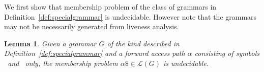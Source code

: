 \documentclass[9pt,preprint,nonatbib]{sigplanconf}
\newtheorem{proposition}[theorem]{Proposition}
\newtheorem{lemma}[theorem]{Lemma}
\begin{document}
We first show that membership problem of the class of grammars in
Definition~\ref{def:specialgrammar} is undecidable. However note that
the grammars may not be necessarily generated from liveness analysis.
\newcommand{\state}{\ensuremath{\mathsf{S}}}
\newcommand{\nont}[2]{\ensuremath{\mathsf{S}_{#1}^{#2}}}  
\begin{lemma}\label{lemma:grammar-undecidable}
Given a grammar    $G$    of   the    kind    described    in
Definition~\ref{def:specialgrammar}  and a forward access path $\alpha$
consisting  of symbols \acar\  and \acdr\  only, the membership problem
$\alpha\$ \in \mathscr{L}(G)$ is undecidable.
\end{lemma} 
\end{document}
